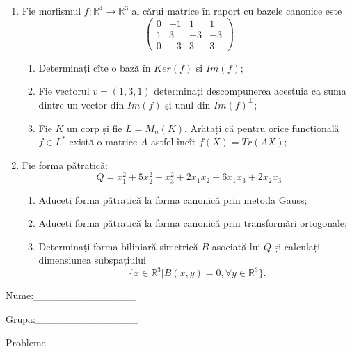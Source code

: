 \documentclass{article}
\begin{document}
\begin{enumerate}
 \item Fie morfismul $f:\mathbb{R}^4 \to \mathbb{R}^3$ al cărui matrice în raport cu bazele canonice este
$$\begin{pmatrix}
0&-1&1&1\\
1&3&-3&-3\\
0&-3&3&3
\end{pmatrix}$$

\begin{enumerate}
\item Determinați cîte o bază în $Ker(f)$ și $Im(f)$;
\item Fie vectorul $v=(1,3,1)$ determinați descompunerea acestuia ca suma dintre un vector din $Im(f)$ și unul din $Im(f)^\perp$;
\item Fie $K$ un corp și fie $L=M_n(K)$. Arătați că pentru orice funcțională $f \in L^*$ există o matrice $A$ astfel încît $f(X)=Tr(AX)$;
\end{enumerate}
\item Fie forma pătratică:
$$Q= x_1^2+5x_2^2+x_3^2+2x_1x_2+6x_1x_3+2x_2x_3$$

\begin{enumerate}
\item Aduceți forma pătratică la forma canonică prin metoda Gauss;
\item Aduceți forma pătratică la forma canonică prin transformări ortogonale;
\item Determinați forma biliniară simetrică $B$ asociată lui $Q$ și calculați dimensiunea subspațiului
$$\{x \in \mathbb{R}^3 | B(x,y)=0,\forall y \in \mathbb{R}^3\}.$$

\end{enumerate}
\end{enumerate}
\newpage
\begin{flushright}
Nume:\_\_\_\_\_\_\_\_\_\_\_\_\_\_
 
 
Grupa:\_\_\_\_\_\_\_\_\_\_\_\_\_\_
\end{flushright}
\begin{center}
\vspace{2cm}
{\Large Probleme}
\vspace{2cm}
\end{center}
\end{document}
